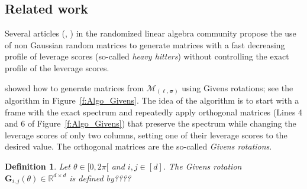 \documentclass[twoside,11pt]{book}
\newtheorem{definition}{Definition}
\numberwithin{theorem}{chapter}
\numberwithin{definition}{chapter}
\numberwithin{proposition}{chapter}
\numberwithin{corollary}{chapter}
\numberwithin{example}{chapter}
\numberwithin{lemma}{chapter}
\numberwithin{assumption}{chapter}
\begin{document}
\subsection{Related work}

Several articles (\citealp{RaMa14}, \citealp{MaMaYu14}) in the randomized linear algebra community propose the use of non Gaussian random matrices to generate matrices with a fast decreasing profile of leverage scores (so-called \emph{heavy hitters}) without controlling the exact profile of the leverage scores.

\cite{DhHeSuTr05} showed how to generate matrices from $\mathcal{M}_{(\bm{\ell},\bm{\sigma})}$ using Givens rotations; see the algorithm in Figure~\ref{f:Algo_Givens}. The idea of the algorithm is to start with a frame with the exact spectrum and repeatedly apply orthogonal matrices (Lines 4 and 6 of Figure~\ref{f:Algo_Givens}) that preserve the spectrum while changing the leverage scores of only two columns, setting one of their leverage scores to the desired value. The orthogonal matrices are the so-called \emph{Givens rotations}.
\begin{definition}
Let $\theta \in [0, 2\pi[$ and $i,j \in [d]$. The Givens rotation $\bm{G}_{i,j}(\theta) \in \mathbb{R}^{d \times d}$ is defined by????

\end{definition}
\end{document}
